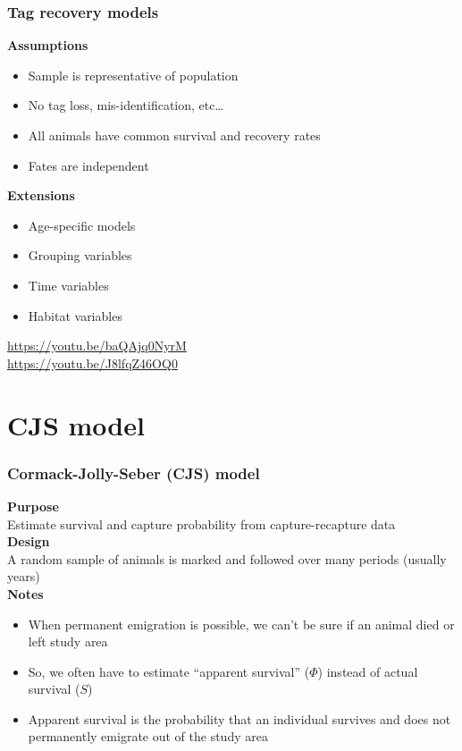\documentclass[color=usenames,dvipsnames]{beamer}\usepackage[]{graphicx}\usepackage[]{color}
\begin{document}
\begin{frame}
  \frametitle{Tag recovery models}
  \large
  {\bf Assumptions}
  \begin{itemize}
    \item Sample is representative of population
    \item No tag loss, mis-identification, etc\dots
    \item All animals have common survival and recovery rates
    \item Fates are independent
  \end{itemize}
  \pause
  \vfill
  {\bf Extensions}
  \begin{itemize}
    \item Age-specific models
    \item Grouping variables
    \item Time variables
    \item Habitat variables
  \end{itemize}
  \vfill
  \centering
  \color{blue}
  \url{
    https://youtu.be/baQAjq0NyrM
  } \\
  \url{
    https://youtu.be/J8lfqZ46OQ0 
  } \\
\end{frame}




\section{CJS model}

\begin{frame}
  \frametitle{Cormack-Jolly-Seber (CJS) model}
  {\bf Purpose} \\
  Estimate survival and capture probability from capture-recapture data \\
  \pause
  \vspace{0.5cm}
  {\bf Design} \\
  A random sample of animals is marked and followed over many periods
  (usually years) \\
  \pause
  \vspace{0.5cm}
  {\bf Notes} \\
  \begin{itemize}[<+->]
    \item When permanent emigration is possible, we can't be sure if
    an animal died or left study area
    \item So, we often have to estimate ``apparent survival'' ($\Phi$)
      instead of actual survival ($S$)
    \item Apparent survival is the probability that an individual
      survives and does not permanently emigrate out of the study area
  \end{itemize}
\end{frame}
\end{document}
